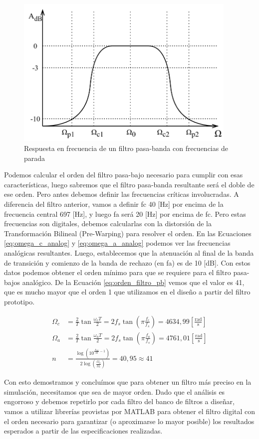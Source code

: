 \begin{figure}[H]
  \centering
  \includegraphics[width=300pt]{images/diagramas-bode-filtro-bp-mejorado.png}
  \caption{Respuesta en frecuencia de un filtro pasa-banda con frecuencias de parada}
  \label{fig:diagrama_bode_pasa_banda}
\end{figure}

Podemos calcular el orden del filtro pasa-bajo necesario para cumplir con esas características, luego sabremos que el filtro pasa-banda resultante será el doble de ese orden. Pero antes debemos definir las frecuencias críticas involucradas. A diferencia del filtro anterior, vamos a definir \gls{fc} 40 [Hz] por encima de la frecuencia central 697 [Hz], y luego \gls{fa} será 20 [Hz] por encima de \gls{fc}. Pero estas frecuencias son digitales, debemos calcularlas con la distorsión de la Transformación Bilineal (Pre-Warping) para resolver el orden. En las Ecuaciones \ref{eq:omega_c_analog} y \ref{eq:omega_a_analog} podemos ver las frecuencias analógicas resultantes. Luego, establecemos que la atenuación al final de la banda de transición y comienzo de la banda de rechazo (en \gls{fa}) es de 10 [dB]. Con estos datos podemos obtener el orden mínimo para que se requiere para el filtro pasa-bajos analógico. De la Ecuación \ref{eq:orden_filtro_pb} vemos que el valor es 41, que es mucho mayor que el orden 1 que utilizamos en el diseño a partir del filtro prototipo.

\begin{align}
  \Omega_c & = \frac{2}{T} \tan \frac{\omega_c T}{2} = 2 f_s \tan\left(\pi \frac{f_c}{f_s}\right) = 4634,99 \mathrm{\left[\frac{rad}{s}\right]} \label{eq:omega_c_analog} \\
  \Omega_a & = \frac{2}{T} \tan \frac{\omega_a T}{2} = 2 f_s \tan\left(\pi \frac{f_a}{f_s}\right) = 4761,01 \mathrm{\left[\frac{rad}{s}\right]} \label{eq:omega_a_analog} \\
  n        & = \frac{\log\left(10^{\frac{A_{dB}}{10}-1}\right)}{2\log\left(\frac{\Omega_a}{\Omega_c}\right)} = 40,95 \approx 41 \label{eq:orden_filtro_pb}
\end{align}

Con esto demostramos y concluímos que para obtener un filtro más preciso en la simulación, necesitamos que sea de mayor orden. Dado que el análisis es engorroso y debemos repetirlo por cada filtro del banco de filtros a diseñar, vamos a utilizar librerías provistas por MATLAB para obtener el filtro digital con el orden necesario para garantizar (o aproximarse lo mayor posible) los resultados esperados a partir de las especificaciones realizadas.
